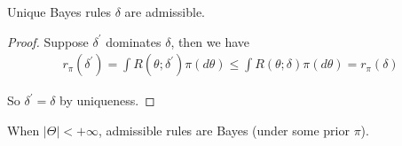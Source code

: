 \begin{prop}
Unique Bayes rules $\delta$ are admissible.
\end{prop}

\begin{proof}
    Suppose $\delta^{\prime}$ dominates $\delta$, then we have
\begin{align*}
r_\pi\left(\delta^{\prime}\right)=\int R\left(\theta; \delta^{\prime}\right) \pi(d \theta) \leq \int R(\theta; \delta) \pi(d \theta)=r_\pi(\delta)
\end{align*}

So $\delta^{\prime}=\delta$ by uniqueness.
\end{proof}

\begin{prop}
    When $|\Theta|<+\infty$, admissible rules are Bayes (under some prior $\pi$).
\end{prop}


